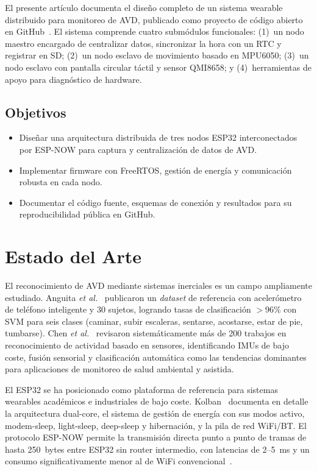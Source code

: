 \documentclass[10pt,twocolumn,a4paper]{article}
\begin{document}
El presente artículo documenta el diseño completo de un sistema wearable
distribuido para monitoreo de AVD, publicado como proyecto de código
abierto en GitHub~\cite{repo_github}. El sistema comprende cuatro
submódulos funcionales: (1)~un nodo maestro encargado de centralizar
datos, sincronizar la hora con un RTC y registrar en SD; (2)~un nodo
esclavo de movimiento basado en MPU6050; (3)~un nodo esclavo con
pantalla circular táctil y sensor QMI8658; y (4)~herramientas de apoyo
para diagnóstico de hardware.

\subsection{Objetivos}

\begin{itemize}
  \item Diseñar una arquitectura distribuida de tres nodos ESP32
        interconectados por ESP-NOW para captura y centralización de
        datos de AVD.
  \item Implementar firmware con FreeRTOS, gestión de energía y
        comunicación robusta en cada nodo.
  \item Documentar el código fuente, esquemas de conexión y resultados
        para su reproducibilidad pública en GitHub.
\end{itemize}

\section{Estado del Arte}

El reconocimiento de AVD mediante sistemas inerciales es un campo
ampliamente estudiado. Anguita \textit{et al.}~\cite{anguita2012}
publicaron un \textit{dataset} de referencia con acelerómetro de
teléfono inteligente y 30 sujetos, logrando tasas de clasificación
$>$96\% con SVM para seis clases (caminar, subir escaleras, sentarse,
acostarse, estar de pie, tumbarse). Chen \textit{et al.}~\cite{chen2012}
revisaron sistemáticamente más de 200 trabajos en reconocimiento de
actividad basado en sensores, identificando IMUs de bajo coste, fusión
sensorial y clasificación automática como las tendencias dominantes
para aplicaciones de monitoreo de salud ambiental y asistida.

El ESP32 se ha posicionado como plataforma de referencia para sistemas
wearables académicos e industriales de bajo coste. Kolban~\cite{kolban2017}
documenta en detalle la arquitectura dual-core, el sistema de gestión
de energía con sus modos activo, modem-sleep, light-sleep, deep-sleep y
hibernación, y la pila de red WiFi/BT. El protocolo ESP-NOW permite la
transmisión directa punto a punto de tramas de hasta 250~bytes entre
ESP32 sin router intermedio, con latencias de 2--5~ms y un consumo
significativamente menor al de WiFi convencional~\cite{espnow_docs}.
\end{document}
